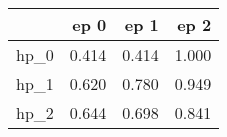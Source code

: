 \begin{tabular}{lrrr}
\toprule
{} &   ep 0 &   ep 1 &   ep 2 \\
\midrule
hp\_0 &  0.414 &  0.414 &  1.000 \\
hp\_1 &  0.620 &  0.780 &  0.949 \\
hp\_2 &  0.644 &  0.698 &  0.841 \\
\bottomrule
\end{tabular}
